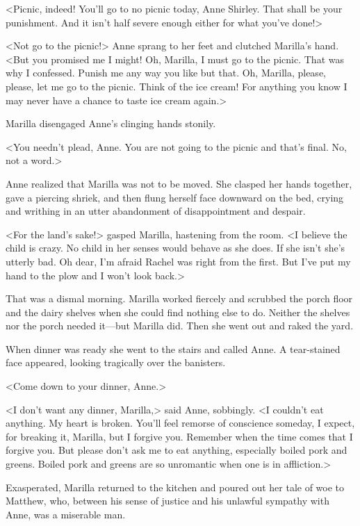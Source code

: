 <Picnic, indeed! You'll go to no picnic today, Anne Shirley. That shall be your punishment. And it isn't half severe enough either for what you've done!>

<Not go to the picnic!> Anne sprang to her feet and clutched Marilla's hand. <But you promised me I might! Oh, Marilla, I must go to the picnic. That was why I confessed. Punish me any way you like but that. Oh, Marilla, please, please, let me go to the picnic. Think of the ice cream! For anything you know I may never have a chance to taste ice cream again.>

Marilla disengaged Anne's clinging hands stonily.

<You needn't plead, Anne. You are not going to the picnic and that's final. No, not a word.>

Anne realized that Marilla was not to be moved. She clasped her hands together, gave a piercing shriek, and then flung herself face downward on the bed, crying and writhing in an utter abandonment of disappointment and despair.

<For the land's sake!> gasped Marilla, hastening from the room. <I believe the child is crazy. No child in her senses would behave as she does. If she isn't she's utterly bad. Oh dear, I'm afraid Rachel was right from the first. But I've put my hand to the plow and I won't look back.>

That was a dismal morning. Marilla worked fiercely and scrubbed the porch floor and the dairy shelves when she could find nothing else to do. Neither the shelves nor the porch needed it—but Marilla did. Then she went out and raked the yard.

When dinner was ready she went to the stairs and called Anne. A tear-stained face appeared, looking tragically over the banisters.

<Come down to your dinner, Anne.>

<I don't want any dinner, Marilla,> said Anne, sobbingly. <I couldn't eat anything. My heart is broken. You'll feel remorse of conscience someday, I expect, for breaking it, Marilla, but I forgive you. Remember when the time comes that I forgive you. But please don't ask me to eat anything, especially boiled pork and greens. Boiled pork and greens are so unromantic when one is in affliction.>

Exasperated, Marilla returned to the kitchen and poured out her tale of woe to Matthew, who, between his sense of justice and his unlawful sympathy with Anne, was a miserable man.

